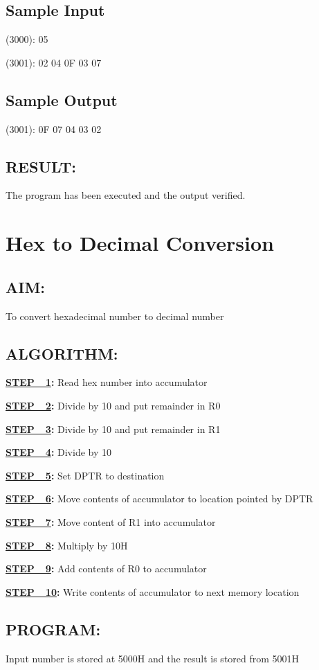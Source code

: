 \documentclass[a4paper,28pt]{report}
\begin{document}
\section*{Sample Input}
(3000): 05

(3001): 02
 04
 0F
 03
 07

\section*{Sample Output}
(3001): 0F 
 07 
 04
 03
 02

\section*{RESULT:}
The program has been executed and the output verified.
%
%
\chapter{Hex to Decimal Conversion}
\section*{AIM:}
To convert hexadecimal number to decimal number

\section*{ALGORITHM:}
\textbf{\underline{STEP\ \ 1}:} Read hex number into accumulator

\textbf{\underline{STEP\ \ 2}:} Divide by 10 and put remainder in R0

\textbf{\underline{STEP\ \ 3}:} Divide by 10 and put remainder in R1

\textbf{\underline{STEP\ \ 4}:} Divide by 10

\textbf{\underline{STEP\ \ 5}:} Set DPTR to destination

\textbf{\underline{STEP\ \ 6}:} Move contents of accumulator to location pointed by DPTR

\textbf{\underline{STEP\ \ 7}:} Move content of R1 into accumulator

\textbf{\underline{STEP\ \ 8}:} Multiply by 10H

\textbf{\underline{STEP\ \ 9}:} Add contents of R0 to accumulator

\textbf{\underline{STEP\ \ 10}:}   Write contents of accumulator to next memory location

\section*{PROGRAM:}
Input number is stored at 5000H and the result is stored from 5001H
\end{document}
